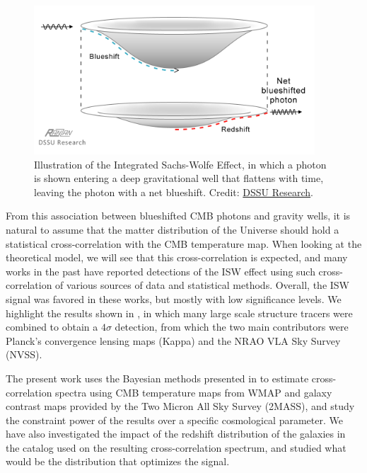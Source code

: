 \documentclass[openany,a4paper,12pt,oneside]{book}
\begin{document}
\begin{spacing}{1.5}
\begin{figure}[!htb]
	\centering
	\includegraphics[width=.7\linewidth]{Imagens/ISW_illustration.png}
	\caption{Illustration of the Integrated Sachs-Wolfe Effect, in which a photon is shown entering a deep gravitational well that flattens with time, leaving the photon with a net blueshift. Credit: \href{http://www.cellularuniverse.org/SachsWolfe-Disproof(ijass)-Ranzan.pdf}{DSSU Research}.}	
	\label{fig:ISW_illustration}
\end{figure}


From this association between blueshifted CMB photons and gravity wells, it is natural to assume that the matter distribution of the Universe should hold a statistical cross-correlation with the CMB temperature map. When looking at the theoretical model, we will see that this cross-correlation is expected\cite{ISW_detect_Crittenden1996, ISW_detect_Cooray2002}, and many works in the past have reported detections of the ISW effect using such cross-correlation of various sources of data and statistical methods\cite{ISW_detect_Boughn2004, ISW_detect_Nolta2004, ISW_detect_Gaztanga2006, ISW_detect_and_review2011}. Overall, the ISW signal was favored in these works, but mostly with low significance levels. We highlight the results shown in \cite{cross_corr:Planck}, in which many large scale structure tracers were combined to obtain a $4\sigma$ detection, from which the two main contributors were Planck's convergence lensing maps (Kappa) and the NRAO VLA Sky Survey (NVSS)\cite{NVSS}.

The present work uses the Bayesian methods presented in \cite{Moura-Santos_2016} to estimate cross-correlation spectra using CMB temperature maps from WMAP\cite{WMAP_results,WMAP_data} and galaxy contrast maps provided by the Two Micron All Sky Survey (2MASS)\cite{2MASS}, and study the constraint power of the results over a specific cosmological parameter. We have also investigated the impact of the redshift distribution of the galaxies in the catalog used on the resulting cross-correlation spectrum, and studied what would be the distribution that optimizes the signal.  


\end{spacing}
\end{document}
